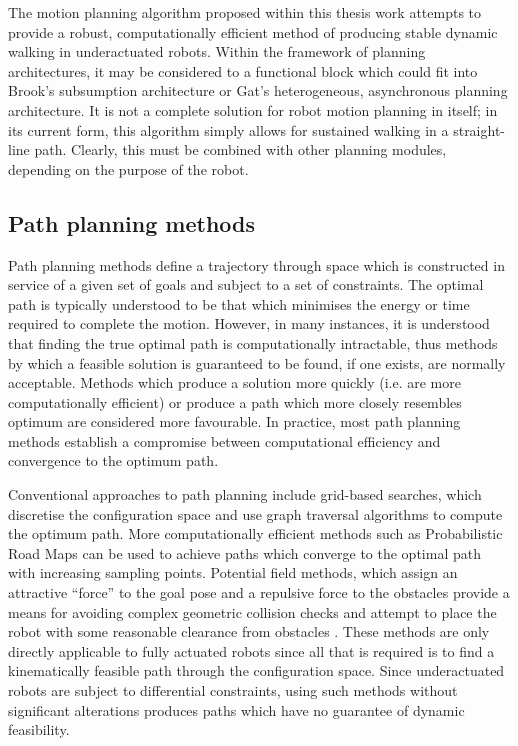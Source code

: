 The motion planning algorithm proposed within this thesis work attempts to provide a robust, computationally efficient method of producing stable dynamic walking in underactuated robots. Within the framework of planning architectures, it may be considered to a functional block which could fit into Brook's subsumption architecture or Gat's heterogeneous, asynchronous planning architecture. It is not a complete solution for robot motion planning in itself; in its current form, this algorithm simply allows for sustained walking in a straight-line path. Clearly, this must be combined with other planning modules, depending on the purpose of the robot.

\subsection{Path planning methods}
Path planning methods define a trajectory through space which is constructed in service of a given set of goals and subject to a set of constraints. The optimal path is typically understood to be that which minimises the energy or time required to complete the motion. However, in many instances, it is understood that finding the true optimal path is computationally intractable, thus methods by which a feasible solution is guaranteed to be found, if one exists, are normally acceptable. Methods which produce a solution more quickly (i.e. are more computationally efficient) or produce a path which more closely resembles optimum are considered more favourable. In practice, most path planning methods establish a compromise between computational efficiency and convergence to the optimum path. 

Conventional approaches to path planning include grid-based searches, which discretise the configuration space and use graph traversal algorithms to compute the optimum path. More computationally efficient methods such as Probabilistic Road Maps \cite{boor1999gaussian} can be used to achieve paths which converge to the optimal path with increasing sampling points. Potential field methods, which assign an attractive ``force'' to the goal pose and a repulsive force to the obstacles provide a means for avoiding complex geometric collision checks and attempt to place the robot with some reasonable clearance from obstacles \cite{hwang1992potential}. These methods are only directly applicable to fully actuated robots since all that is required is to find a kinematically feasible path through the configuration space. Since underactuated robots are subject to differential constraints, using such methods without significant alterations produces paths which have no guarantee of dynamic feasibility. 

